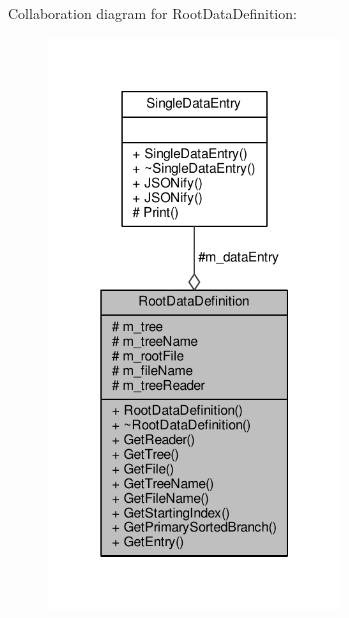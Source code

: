 Collaboration diagram for Root\+Data\+Definition\+:
\nopagebreak
\begin{figure}[H]
\begin{center}
\leavevmode
\includegraphics[width=220pt]{classRootDataDefinition__coll__graph}
\end{center}
\end{figure}
